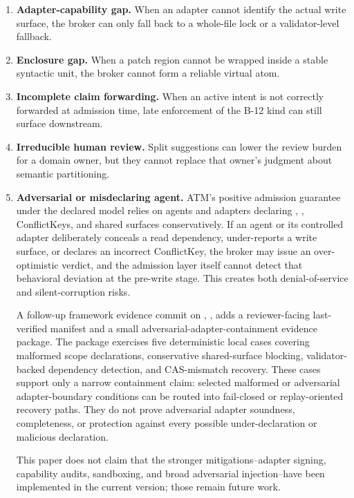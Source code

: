 \documentclass[9pt,letterpaper]{extarticle}
\begin{document}
\begin{enumerate}
\item \textbf{Adapter-capability gap.} When an adapter cannot identify the actual write surface, the broker can only fall back to a whole-file lock or a validator-level fallback.
\item \textbf{Enclosure gap.} When a patch region cannot be wrapped inside a stable syntactic unit, the broker cannot form a reliable virtual atom.
\item \textbf{Incomplete claim forwarding.} When an active intent is not correctly forwarded at admission time, late enforcement of the B-12 kind can still surface downstream.
\item \textbf{Irreducible human review.} Split suggestions can lower the review burden for a domain owner, but they cannot replace that owner's judgment about semantic partitioning.
\item \textbf{Adversarial or misdeclaring agent.} ATM's positive admission guarantee under the declared model relies on agents and adapters declaring \texttt{}, \texttt{}, ConflictKeys, and shared surfaces conservatively. If an agent or its controlled adapter deliberately conceals a read dependency, under-reports a write surface, or declares an incorrect ConflictKey, the broker may issue an over-optimistic \texttt{} verdict, and the admission layer itself cannot detect that behavioral deviation at the pre-write stage. This creates both denial-of-service and silent-corruption risks.

A follow-up framework evidence commit on \texttt{}, \texttt{}, adds a reviewer-facing last-verified manifest and a small adversarial-adapter-containment evidence package. The package exercises five deterministic local cases covering malformed scope declarations, conservative shared-surface blocking, validator-backed dependency detection, and CAS-mismatch recovery. These cases support only a narrow containment claim: selected malformed or adversarial adapter-boundary conditions can be routed into fail-closed or replay-oriented recovery paths. They do not prove adversarial adapter soundness, completeness, or protection against every possible under-declaration or malicious declaration.

This paper does not claim that the stronger mitigations--adapter signing, capability audits, sandboxing, and broad adversarial injection--have been implemented in the current version; those remain future work.


\end{enumerate}
\end{document}
